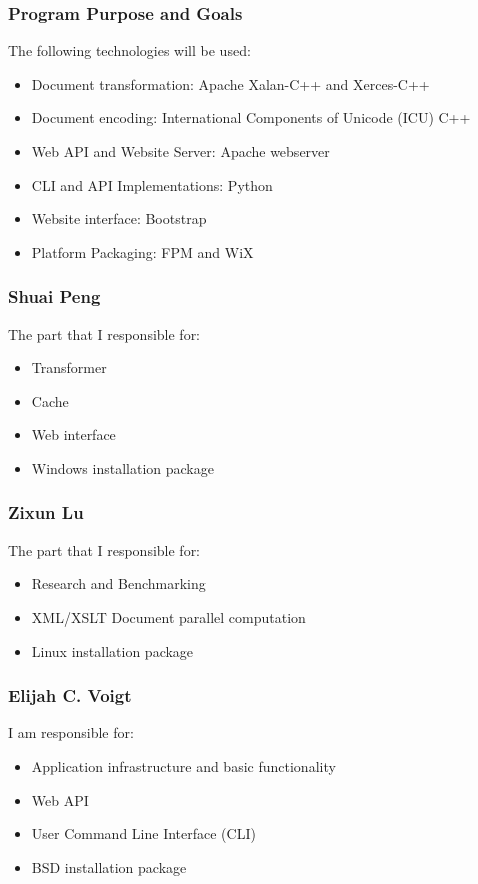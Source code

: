 \documentclass[pdf]{beamer}
\begin{document}
\begin{frame}
	\frametitle{Program Purpose and Goals}
    The following technologies will be used:
    \begin{itemize}
    \item Document transformation: Apache Xalan-C++ and Xerces-C++
    \item Document encoding: International Components of Unicode (ICU) C++
    \item Web API and Website Server: Apache webserver
    \item CLI and API Implementations: Python
    \item Website interface: Bootstrap
    \item Platform Packaging: FPM and WiX
    \end{itemize}
\end{frame}

\begin{frame}
	\frametitle{Shuai Peng}
    The part that I responsible for:
    \begin{itemize}
    \item Transformer
    \item Cache
    \item Web interface
    \item Windows installation package
    \end{itemize}
\end{frame}

\begin{frame}
    \frametitle{Zixun Lu}
    The part that I responsible for:
    \begin{itemize}
    \item Research and Benchmarking
    \item XML/XSLT Document parallel computation
    \item Linux installation package
    \end{itemize}
\end{frame}

\begin{frame}
	\frametitle{Elijah C. Voigt}
    I am responsible for:
    \begin{itemize}
    \item Application infrastructure and basic functionality
    \item Web API
    \item User Command Line Interface (CLI)
    \item BSD installation package
    \end{itemize}
\end{frame}
\end{document}
